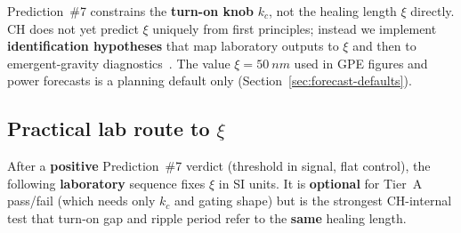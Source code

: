 \documentclass[11pt,a4paper]{article}
\begin{document}
Prediction~\#7 constrains the \textbf{turn-on knob} $k_c$, not the healing length $\xi$ directly.
CH does not yet predict $\xi$ uniquely from first principles; instead we implement \textbf{identification hypotheses} that map laboratory outputs to $\xi$ and then to emergent-gravity diagnostics~\cite{CHSpaceFabric2026}.
The value $\xi = \SI{50}{nm}$ used in GPE figures and power forecasts is a planning default only (Section~\ref{sec:forecast-defaults}).

\subsection{Practical lab route to $\xi$}
\label{sec:xi-lab-route}

After a \textbf{positive} Prediction~\#7 verdict (threshold in signal, flat control), the following \textbf{laboratory} sequence fixes $\xi$ in SI units.
It is \textbf{optional} for Tier~A pass/fail (which needs only $k_c$ and gating shape) but is the strongest CH-internal test that turn-on gap and ripple period refer to the \textbf{same} healing length.
\end{document}
